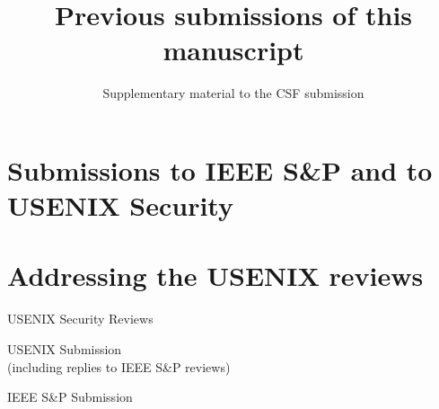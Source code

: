 \documentclass[a4paper]{scrartcl}
\title{Previous submissions of this manuscript}
\subtitle{Supplementary material to the CSF submission}
\date{}
\author{}
\begin{document}
  \maketitle

\section*{Submissions to IEEE S\&P and to USENIX Security}

\section*{Addressing the USENIX reviews}

\newpage
\vspace*{10cm}
\begin{center}
  \textsf{
\Huge{USENIX Security Reviews}
}
\end{center}
\newpage









\newpage
\vspace*{10cm}
\begin{center}
  \textsf{
\Huge{USENIX Submission}\\
\large{(including replies to IEEE S\&P reviews)}
}
\end{center}
\newpage



\newpage
\vspace*{10cm}
\begin{center}
  \textsf{
\Huge{IEEE S\&P Submission}\\
}
\end{center}
\newpage


\end{document}
